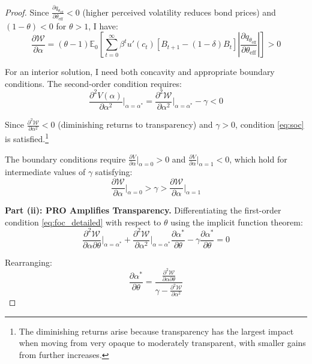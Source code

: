 \documentclass[12pt]{article}
\theoremstyle{plain}
\begin{document}
\begin{proof}
	Since $\frac{\partial q_{\theta_{\text{eff}}}}{\partial \theta_{\text{eff}}} <
		0$ (higher perceived volatility reduces bond prices) and $(1-\theta) < 0$ for
$\theta > 1$, I have:
	\begin{equation}
		\frac{\partial \mathcal{W}}{\partial \alpha} = (\theta-1) \mathbb{E}_0 \left[ \sum_{t=0}^\infty \beta^t u'(c_t) [B_{t+1} - (1-\delta)B_t] \left|\frac{\partial q_{\theta_{\text{eff}}}}{\partial \theta_{\text{eff}}}\right| \right] > 0 \label{eq:marginal_benefit}
	\end{equation}

For an interior solution, I need both concavity and appropriate boundary
	conditions. The second-order condition requires:
	\begin{equation}
		\frac{\partial^2 V(\alpha)}{\partial \alpha^2}\bigg|_{\alpha=\alpha^*} = \frac{\partial^2 \mathcal{W}}{\partial \alpha^2}\bigg|_{\alpha=\alpha^*} - \gamma < 0 \label{eq:soc}
	\end{equation}

	Since $\frac{\partial^2 \mathcal{W}}{\partial \alpha^2} < 0$ (diminishing
	returns to transparency) and $\gamma > 0$, condition \eqref{eq:soc} is
	satisfied.\footnote{The diminishing returns arise because transparency has the
		largest impact when moving from very opaque to moderately transparent, with
		smaller gains from further increases.}

	The boundary conditions require $\frac{\partial V}{\partial \alpha}|_{\alpha=0}
		> 0$ and $\frac{\partial V}{\partial \alpha}|_{\alpha=1} < 0$, which hold for
	intermediate values of $\gamma$ satisfying:
	\begin{equation}
		\frac{\partial \mathcal{W}}{\partial \alpha}\bigg|_{\alpha=0} > \gamma > \frac{\partial \mathcal{W}}{\partial \alpha}\bigg|_{\alpha=1} \label{eq:gamma_bounds}
	\end{equation}

	\textbf{Part (ii): PRO Amplifies Transparency.}
	Differentiating the first-order condition \eqref{eq:foc_detailed} with respect to $\theta$ using the implicit function theorem:
	\begin{equation}
		\frac{\partial^2 \mathcal{W}}{\partial \alpha \partial \theta}\bigg|_{\alpha=\alpha^*} + \frac{\partial^2 \mathcal{W}}{\partial \alpha^2}\bigg|_{\alpha=\alpha^*} \frac{\partial \alpha^*}{\partial \theta} - \gamma \frac{\partial \alpha^*}{\partial \theta} = 0 \label{eq:ift_application}
	\end{equation}

	Rearranging:
	\begin{equation}
		\frac{\partial \alpha^*}{\partial \theta} = \frac{\frac{\partial^2 \mathcal{W}}{\partial \alpha \partial \theta}}{\gamma - \frac{\partial^2 \mathcal{W}}{\partial \alpha^2}} \label{eq:transparency_theta_derivative}
	\end{equation}


\end{proof}
\end{document}
